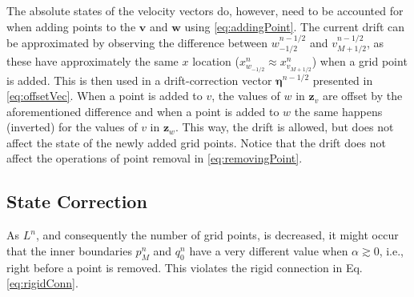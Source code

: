 The absolute states of the velocity vectors do, however, need to be accounted for when adding points to the $\mathbf{v}$ and $\mathbf{w}$ using \eqref{eq:addingPoint}. The current drift can be approximated by observing the difference between $w_{-1/2}^{n-1/2}$ and $v_{M+1/2}^{n-1/2}$, as these have approximately the same $x$ location ($x_{w_{-1/2}}^n \approx x_{v_{M+1/2}}^n$) when a grid point is added. This is then used in a drift-correction vector $\boldsymbol{\eta}^{n-1/2}$ presented in \eqref{eq:offsetVec}. When a point is added to $v$, the values of $w$ in $\mathbf{z}_{v}$ are offset by the aforementioned difference and when a point is added to $w$ the same happens (inverted) for the values of $v$ in $\mathbf{z}_w$. This way, the drift is allowed, but does not affect the state of the newly added grid points. Notice that the drift does not affect the operations of point removal in \eqref{eq:removingPoint}.

\subsection{State Correction}
As $L^n$, and consequently the number of grid points, is decreased, it might occur that the inner boundaries $p_M^n$ and $q_0^n$ have a very different value when $\alpha \gtrsim 0$, i.e., right before a point is removed. This violates the rigid connection in Eq. \eqref{eq:rigidConn}. 

